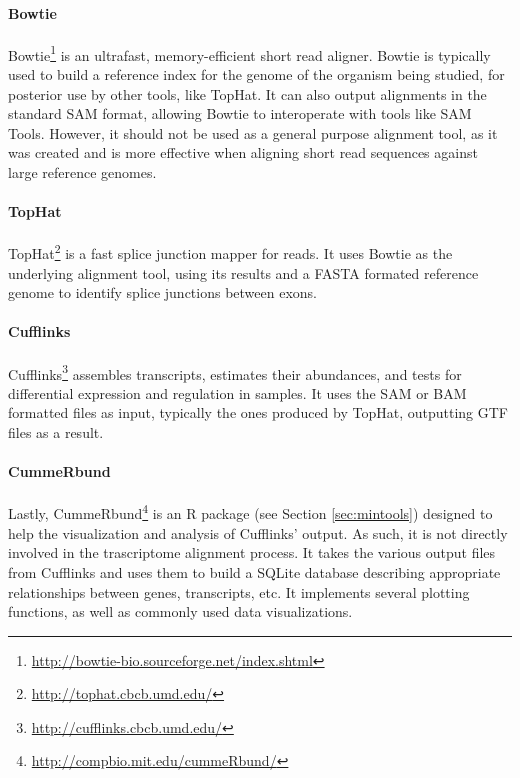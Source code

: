 \paragraph{Bowtie}

Bowtie\footnote{\url{http://bowtie-bio.sourceforge.net/index.shtml}} is an
ultrafast, memory-efficient short read aligner. Bowtie is typically used to
build a reference index for the genome of the organism being studied, for
posterior use by other tools, like TopHat. It can also output alignments in the
standard SAM format, allowing Bowtie to interoperate with tools like SAM Tools.
However, it should not be used as a general purpose alignment tool, as it was
created and is more effective when aligning short read sequences against large
reference genomes.

\paragraph{TopHat}

TopHat\footnote{\url{http://tophat.cbcb.umd.edu/}} is a fast splice junction
mapper for \rnaseq{} reads. It uses Bowtie as the underlying alignment tool,
using its results and a FASTA formated reference genome to identify splice
junctions between exons.

\paragraph{Cufflinks}

Cufflinks\footnote{\url{http://cufflinks.cbcb.umd.edu/}} assembles transcripts,
estimates their abundances, and tests for differential expression and regulation
in \rnaseq{} samples. It uses the SAM or BAM formatted files as input, typically
the ones produced by TopHat, outputting GTF files as a result.

\paragraph{CummeRbund}

Lastly, CummeRbund\footnote{\url{http://compbio.mit.edu/cummeRbund/}} is an R
package (see Section \ref{sec:mintools}) designed to help the visualization and
analysis of Cufflinks' \rnaseq{} output. As such, it is not directly involved in
the trascriptome alignment process. It takes the various output files from
Cufflinks and uses them to build a SQLite database describing appropriate
relationships between genes, transcripts, etc. It implements several plotting
functions, as well as commonly used data visualizations.

